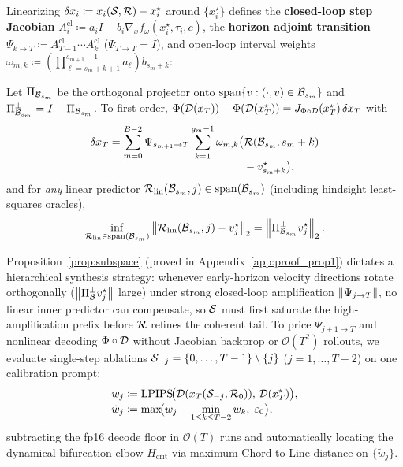 Linearizing $\delta x_i \coloneqq x_i(\mathcal{S}, \mathcal{R}) - x_i^\star$ around $\{x_i^\star\}$ defines the \textbf{closed-loop step Jacobian} $A_i^{\mathrm{cl}} \coloneqq a_i I + b_i \nabla_x f_\omega(x_i^\star, \tau_i, c)$, the \textbf{horizon adjoint transition} $\Psi_{k \to T} \coloneqq A_{T-1}^{\mathrm{cl}} \cdots A_k^{\mathrm{cl}}$ ($\Psi_{T\to T} = I$), and open-loop interval weights $\omega_{m,k} \coloneqq (\prod_{\ell=s_m+k+1}^{s_{m+1}-1} a_\ell) b_{s_m+k}$:

\begin{proposition}
\label{prop:subspace}
Let $\Pi_{\mathcal{B}_{s_m}}$ be the orthogonal projector onto $\mathrm{span}\{v : (\cdot, v) \in \mathcal{B}_{s_m}\}$ and $\Pi_{\mathcal{B}_{s_m}}^\perp = I - \Pi_{\mathcal{B}_{s_m}}$. To first order, $\Phi(\mathcal{D}(x_T)) - \Phi(\mathcal{D}(x_T^\star)) = J_{\Phi \circ \mathcal{D}}(x_T^\star)\,\delta x_T$ with
\begin{equation}
\begin{aligned}
\delta x_T = \sum_{m=0}^{B-2} \Psi_{s_{m+1} \to T} \sum_{k=1}^{g_m - 1} \omega_{m,k} \bigl(&\mathcal{R}(\mathcal{B}_{s_m}, s_m + k) \\[-3pt]
&- v_{s_m+k}^\star\bigr),
\end{aligned}
\label{eq:adjoint_sum}
\end{equation}
and for \emph{any} linear predictor $\mathcal{R}_{\mathrm{lin}}(\mathcal{B}_{s_m}, j) \in \mathrm{span}(\mathcal{B}_{s_m})$ (including hindsight least-squares oracles),
\begin{equation}
\inf_{\mathcal{R}_{\mathrm{lin}} \in \mathrm{span}(\mathcal{B}_{s_m})} \left\lVert \mathcal{R}_{\mathrm{lin}}(\mathcal{B}_{s_m}, j) - v_j^\star \right\rVert_2 = \left\lVert \Pi_{\mathcal{B}_{s_m}}^\perp v_j^\star \right\rVert_2.
\label{eq:subspace_floor}
\end{equation}
\end{proposition}

Proposition~\ref{prop:subspace} (proved in Appendix~\ref{app:proof_prop1}) dictates a hierarchical synthesis strategy: whenever early-horizon velocity directions rotate orthogonally ($\left\lVert \Pi_{\mathcal{B}}^\perp v_j^\star \right\rVert$ large) under strong closed-loop amplification $\left\lVert \Psi_{j\to T} \right\rVert$, no linear inner predictor can compensate, so $\mathcal{S}$ must first saturate the high-amplification prefix before $\mathcal{R}$ refines the coherent tail. To price $\Psi_{j+1\to T}$ and nonlinear decoding $\Phi \circ \mathcal{D}$ without Jacobian backprop or $\mathcal{O}(T^2)$ rollouts, we evaluate single-step ablations $\mathcal{S}_{-j} = \{0,\dots,T-1\}\setminus\{j\}$ ($j = 1,\dots,T-2$) on one calibration prompt:
\begin{equation}
\begin{aligned}
w_j &\coloneqq \mathrm{LPIPS}\!\bigl(\mathcal{D}(x_T(\mathcal{S}_{-j}, \mathcal{R}_0)),\, \mathcal{D}(x_T^\star)\bigr), \\[-2pt]
\tilde{w}_j &\coloneqq \max\!\bigl(w_j - \min_{1 \le k \le T-2} w_k,\; \varepsilon_0\bigr),
\end{aligned}
\label{eq:impulse}
\end{equation}
subtracting the fp16 decode floor in $\mathcal{O}(T)$ runs and automatically locating the dynamical bifurcation elbow $H_{\mathrm{crit}}$ via maximum Chord-to-Line distance on $\{\tilde{w}_j\}$.

